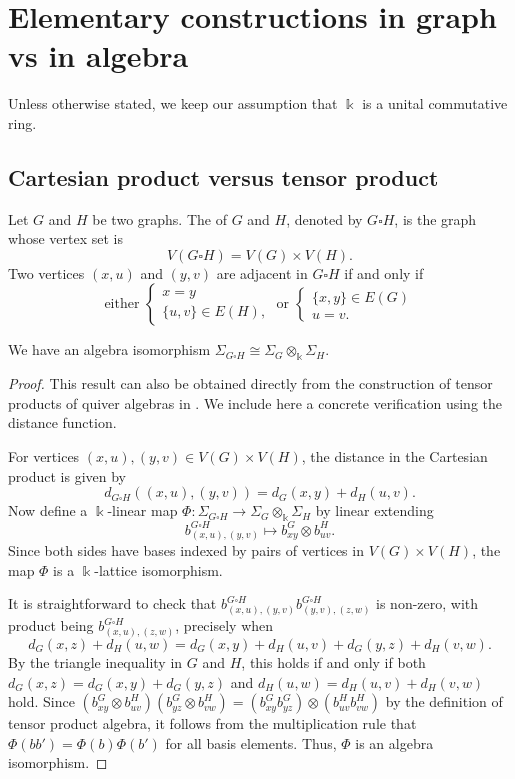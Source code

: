 \documentclass[a4paper,leqno]{amsart}
\begin{document}
\section{Elementary constructions in graph vs in algebra}\label{sec:3-constr}

Unless otherwise stated, we keep our assumption that $\Bbbk$ is a unital commutative ring.

\subsection{Cartesian product versus tensor product}
\begin{dfn}
Let $G$ and $H$ be two graphs. The  of $G$ and $H$, denoted by $G\square H$, is the graph whose vertex set is
$$V(G\square H)=V(G)\times V(H).$$
Two vertices $(x,u)$ and $(y,v)$ are adjacent in $G\square H$ if and only if
\[
\text{either }\begin{cases}
x=y\\ \{u,v\}\in E(H),
\end{cases}\; \text{or }
\begin{cases}
 \{x,y\}\in E(G)\\u=v.
\end{cases}
\]
\end{dfn}

\begin{prop}\label{prop:tensor}
We have an algebra isomorphism
$\Sigma_{G\square H}\cong \Sigma_G\otimes_{\Bbbk} \Sigma_H$.
\end{prop}

\begin{proof}
This result can also be obtained directly from the construction of tensor products of quiver algebras in \cite[Proposition 3]{Her08}. We include here a concrete verification using the distance function.

For vertices $(x,u),(y,v)\in V(G)\times V(H)$, the distance in the Cartesian product is given by
$$d_{G\square H}((x,u),(y,v))=d_G(x,y)+d_H(u,v).$$
Now define a $\Bbbk$-linear map $\Phi:\Sigma_{G\square H}\longrightarrow \Sigma_G\otimes_{\Bbbk} \Sigma_H$ by linear extending
$$b^{G\square H}_{(x,u),(y,v)}\mapsto b^G_{xy}\otimes b^H_{uv}.$$
Since both sides have bases indexed by pairs of vertices in $V(G)\times V(H)$, the map $\Phi$ is a $\Bbbk$-lattice isomorphism.


It is straightforward to check that $b^{G\square H}_{(x,u),(y,v)}b^{G\square H}_{(y,v),(z,w)}$ is non-zero, with product being $b^{G\square H}_{(x,u),(z,w)}$, precisely when
$$d_G(x,z)+d_H(u,w)=d_G(x,y)+d_H(u,v)+d_G(y,z)+d_H(v,w).$$
By the triangle inequality in $G$ and $H$, this holds if and only if both $d_G(x,z)=d_G(x,y)+d_G(y,z)$ and $d_H(u,w)=d_H(u,v)+d_H(v,w)$ hold.
Since $(b^G_{xy}\otimes b^H_{uv})(b^G_{yz}\otimes b^H_{vw})=(b^G_{xy}b^G_{yz})\otimes (b^H_{uv}b^H_{vw})$ by the definition of tensor product algebra, it follows from the multiplication rule that $\Phi(bb')=\Phi(b)\Phi(b')$ for all basis elements.
Thus, $\Phi$ is an algebra isomorphism.
\end{proof}
\end{document}
